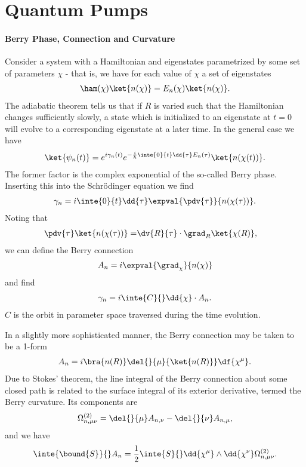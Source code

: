 \section{Quantum Pumps}

\paragraph{Berry Phase, Connection and Curvature}
Consider a system with a Hamiltonian and eigenstates parametrized by some set of parameters $\chi$ - that is, we have for each value of $\chi$ a set of eigenstates
\begin{align*}
	\ham(\chi)\ket{n(\chi)} = E_{n}(\chi)\ket{n(\chi)}.
\end{align*}
The adiabatic theorem tells us that if $R$ is varied such that the Hamiltonian changes sufficiently slowly, a state which is initialized to an eigenstate at $t = 0$ will evolve to a corresponding eigenstate at a later time. In the general case we have
\begin{align*}
	\ket{\psi_{n}(t)} = e^{i\gamma_{n}(t)}e^{-\frac{i}{\hbar}\inte{0}{t}\dd{\tau} E_{n}(\tau)}\ket{n(\chi(t))}.
\end{align*}
The former factor is the complex exponential of the so-called Berry phase. Inserting this into the Schrödinger equation we find
\begin{align*}
	\gamma_{n} = i\inte{0}{t}\dd{\tau}\expval{\pdv{\tau}}{n(\chi(\tau))}.
\end{align*}
Noting that
\begin{align*}
	\pdv{\tau}\ket{n(\chi(\tau))} =& \dv{R}{\tau}\cdot\grad_{R}\ket{\chi(R)},
\end{align*}
we can define the Berry connection
\begin{align*}
	A_{n} = i\expval{\grad_{\chi}}{n(\chi)}
\end{align*}
and find
\begin{align*}
	\gamma_{n} = i\inte{C}{}\dd{\chi}\cdot A_{n}.
\end{align*}
$C$ is the orbit in parameter space traversed during the time evolution.

In a slightly more sophisticated manner, the Berry connection may be taken to be a 1-form
\begin{align*}
	A_{n} = i\bra{n(R)}\del{}{\mu}{\ket{n(R)}}\df{\chi^{\mu}}.
\end{align*}
Due to Stokes' theorem, the line integral of the Berry connection about some closed path is related to the surface integral of its exterior derivative, termed the Berry curvature. Its components are
\begin{align*}
	\Omega^{(2)}_{n, \mu\nu} = \del{}{\mu}A_{n, \nu} - \del{}{\nu}A_{n, \mu},
\end{align*}
and we have
\begin{align*}
	\inte{\bound{S}}{}A_{n} = \frac{1}{2}\inte{S}{}\dd{\chi^{\mu}}\wedge\dd{\chi^{\nu}}\Omega^{(2)}_{n, \mu\nu}.
\end{align*}

